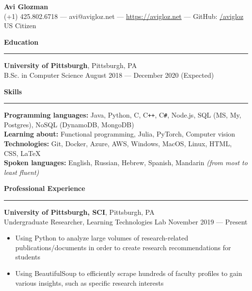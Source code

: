 \documentclass[11pt]{article}
\begin{document}
	\pagestyle{empty}
	\begin{center}
		{\LARGE \textbf{Avi Glozman}}\\
		\vspace{1.25mm}
		{\large (+1) 425.802.6718 --- avi@avigloz.net --- \href{https://avigloz.net}{https://avigloz.net} --- GitHub: \href{https://github.com/avigloz}{/avigloz}}\\
		\vspace{1mm}
		US Citizen
	\end{center}
	
	\begin{flushleft}
		
		\vspace{-1.65mm}
		{\large \raggedright \textbf{Education}}
		\vspace{1.25mm}
	
		\hrule
	
		\vspace{2.25mm}
		\textbf{University of Pittsburgh}, Pittsburgh, PA\\
		{\small B.Sc. in Computer Science \hfill August 2018 --- December 2020 (Expected)}
	
		\vspace{1.5mm}
		{\large \raggedright \textbf{Skills}}
		\vspace{1.25mm}
	
		\hrule
	
		\vspace{2.25mm}
		\textbf{Programming languages:} Java, Python, C, C\texttt{++}, C\verb!#!, Node.js, SQL (MS, My, Postgres), NoSQL (DynamoDB, MongoDB)\\
		\textbf{Learning about:} Functional programming, Julia, PyTorch, Computer vision\\
		\textbf{Technologies:} Git, Docker, Azure, AWS, Windows, MacOS, Linux, HTML, CSS, \LaTeX\\
		\textbf{Spoken languages:} English, Russian, Hebrew, Spanish, Mandarin \textit{(from most to least fluent)}
		
		\vspace{1.35mm}
		{\large \raggedright \textbf{Professional Experience}}
		\vspace{1.25mm}
	
		\hrule

		\vspace{2.25mm}
		\textbf{University of Pittsburgh, SCI}, Pittsburgh, PA\\
		{\small Undergraduate Researcher, Learning Technologies Lab \hfill November 2019 --- Present}
		\vspace{-1.25mm}
		\begin{itemize}
				\item Using Python to analyze large volumes of research-related publications/documents in order to create research recommendations for students
				\vspace{-1.5mm}
				\item Using BeautifulSoup to efficiently scrape hundreds of faculty profiles to gain various insights, such as specific research interests
		\end{itemize}


\end{flushleft}
\end{document}
